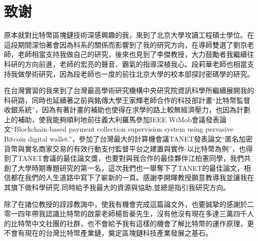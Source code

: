 
\chapter{致谢}
原本就對比特幣區塊鏈技術深感興趣的我，來到了北京大學攻讀工程碩士學位。在這段期間深怕著會因為科系的關係而影響到了我的研究方向，在導師雙選了劉京老師，老師相當支持我做自己的研究，後來也見到了李傑教授，大力鼓勵者我繼續往科研的方向前進，老師的宏亮的聲音、霸氣的指導深植我心。段莉華老師也相當支持我做學術研究，因為段老師也一度的前往北京大學的校本部探討密碼學的研究。

在台灣實習的我來到了台灣最高學術研究機構中央研究院資訊科學所繼續展開我的科研路，同時也延續著之前與銘傳大學王家輝老師合作的科技部計畫“比特幣監督收銀系統”，因為有著計畫的補助也使得在求學的路上較無經濟壓力，也因為計劃上的補助，使我能夠順利地前往義大利羅馬參加IEEE WiMob會議發表論文“Blockchain-based payment collection supervision system using pervasive Bitcoin digital wallet.”，參加了台灣最大的計算機會議TANET發表論文“匿名加密貨幣與實名商家交易的有效行動支付監督平台之建置與實作-以比特幣為例”，也得到了TANET會議的最佳論文獎，也要對與我合作的最佳夥伴江柏憲同學，我們共創了大學時期專題研究的第一名，這次我們也一舉奪下了TANET的最佳論文，相信都在我們的人生道路中寫下了嶄新的一頁。感謝李開暉教授願意教導我並讓我在其旗下做科學研究,同時給予我最大的資源與協助,並總是指引我研究方向。

除了在諸位教授的諄諄教誨中，使我有機會完成這篇論文外，也要誠摯的感謝於二零一四年帶我認識比特幣的啟蒙老師楊哲豪先生，沒有他沒有現在多達三萬四千人的比特幣中文社團的社群，也不會給予我有這樣的機會了解比特幣的運作原理，更不會有現在的台灣比特幣產業鏈，奠定區塊鏈科技產業發展之基石。
